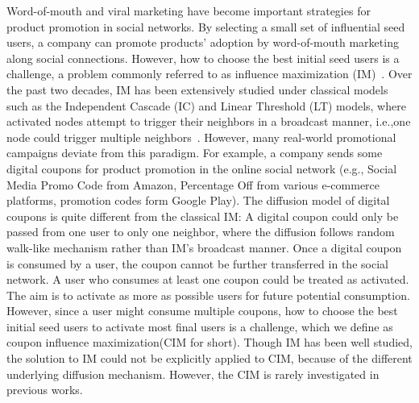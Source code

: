 \documentclass[sigconf]{acmart}
\begin{document}
Word-of-mouth and viral marketing have become important strategies for
product promotion in social networks.
By selecting a small set of influential seed users, a company can
promote products' adoption by word-of-mouth marketing along social connections.
However, how to choose the best initial seed users is a challenge,
 a problem commonly referred
to as influence maximization (IM)~\cite{kempe2003maximizing}.
Over the past two decades, IM has been extensively studied under
classical models such as the Independent Cascade (IC) and Linear
Threshold (LT) models, where activated nodes attempt to trigger their
neighbors in a broadcast manner, i.e.,one node could trigger multiple neighbors~\cite{domingos2001mining,borgs2014maximizing,tang2015influence}.
However, many real-world promotional campaigns deviate from this
paradigm.
For example, a company sends some digital coupons for product promotion in the online social network (e.g., Social Media Promo Code from Amazon, Percentage Off from various e-commerce platforms,
promotion codes form Google Play). The diffusion model of digital coupons is quite  different from the classical IM: A digital coupon could only be passed from one user to only one neighbor, where the diffusion follows random walk-like mechanism rather than IM's broadcast manner. Once a digital coupon is consumed by a user, the coupon cannot be further transferred in the social network. A user who consumes at least one coupon could be treated as activated. The aim is  to activate as more as possible users for future potential consumption. However, since a user might consume multiple coupons, how to choose the best initial seed users to activate most final users is a challenge, which we define as coupon influence maximization(CIM for short). Though IM has been well studied, the solution to IM could not be explicitly applied to CIM, because of the different underlying  diffusion mechanism. However, the CIM is rarely investigated in previous works.
\end{document}
